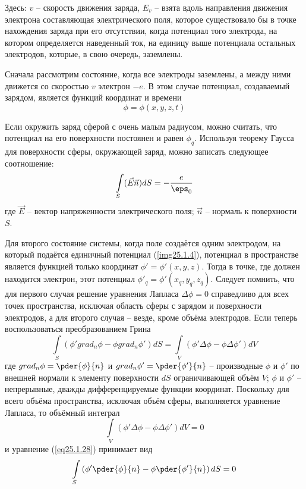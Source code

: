Здесь: \( v \) -- скорость движения заряда, \( E_v \) -- взята вдоль 
направления движения электрона составляющая электрического поля, которое 
существовало бы в точке нахождения заряда при его отсутствии, когда 
потенциал того электрода, на котором определяется наведенный ток, на единицу 
выше потенциала остальных электродов, которые, в свою очередь, заземлены.

Сначала рассмотрим состояние, когда все электроды заземлены, а между ними 
движется со скоростью \( v \) электрон \( -e \). В этом случае потенциал, 
создаваемый зарядом, является функций координат и времени
\[
	\phi = \phi( x, y, z, t )
\]

Если окружить заряд сферой с очень малым радиусом, можно считать, что 
потенциал на его поверхности постоянен и равен \( \phi_q \). Используя 
теорему Гаусса для поверхности сферы, окружающей заряд, можно записать 
следующее соотношение:
\[
	\int\limits_S (\vec{E}\vec{n}) dS = -\frac{e}{\eps_0}
\]
где \( \vec{E} \) -- вектор напряженности электрического поля; 
\( \vec{n} \) -- нормаль к поверхности \( S \).

Для второго состояние системы, когда поле создаётся одним электродом, на 
который подаётся единичный потенциал (\ref{img25.1.4}), потенциал в 
пространстве является функцией только координат 
\( \phi' = \phi'( x, y, z ) \). Тогда в точке, где должен находится электрон, 
этот потенциал \( \phi'_q = \phi'( x_q, y_q, z_q ) \). Следует помнить, что  
для первого случая решение уравнения Лапласа \( \Delta\phi = 0 \) справедливо 
для всех точек пространства, исключая область сферы с зарядом и поверхности 
электродов, а для второго случая -- везде, кроме объёма электродов. Если 
теперь воспользоваться преобразованием Грина
\begin{equation}
	\int\limits_S (\phi' grad_n\phi - \phi grad_n\phi') dS = 
		\int\limits_V (\phi'\Delta\phi - \phi\Delta\phi') dV
	\label{eq25.1.28}
\end{equation}
где \(  grad_n\phi = \pder{\phi}{n} \) и 
\(  grad_n\phi' = \pder{\phi'}{n} \) -- производные \( \phi \) и \( \phi' \) 
по внешней нормали к элементу поверхности \( dS \) ограничивающей объём 
\( V \); \( \phi \) и \( \phi' \) -- непрерывные, дважды дифференцируемые 
функции координат. Поскольку для всего объёма пространства, исключая объём 
сферы, выполняется уравнение Лапласа, то объёмный интеграл
\[
	\int\limits_V (\phi'\Delta\phi - \phi\Delta\phi') dV = 0
\]
и уравнение (\ref{eq25.1.28}) принимает вид
\begin{equation}
	\int\limits_S \left(
		\phi'\pder{\phi}{n} - \phi\pder{\phi'}{n}
	\right) dS = 0
	\label{eq26.1.29}
\end{equation}

